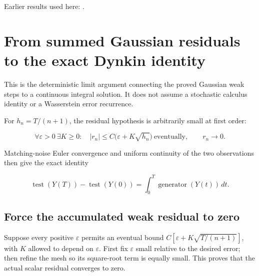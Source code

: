 \documentclass[11pt,a4paper]{report}
\begin{document}
Earlier results used here: \cite[Section~3.16.1]{LangevinLean2026ULASC}.
\section{\texorpdfstring{From summed Gaussian residuals to the exact Dynkin identity}{From summed Gaussian residuals to the exact Dynkin identity}}
\label{proof-module-AverageLMC-LaplacianDynkinLimit-lean}


This is the deterministic limit argument connecting the proved Gaussian weak steps to a continuous integral solution. It does not assume a stochastic calculus identity or a Wasserstein error recurrence.



For \(h_n=T/(n+1)\), the residual hypothesis is arbitrarily small at first order:


\[\forall\varepsilon>0\ \exists K\ge0:\quad
|r_n|\le C\bigl(\varepsilon+K\sqrt{h_n}\bigr)
\ \text{eventually},\qquad r_n\longrightarrow0.\]


Matching-noise Euler convergence and uniform continuity of the two observations then give the exact identity


\[\operatorname{test}(Y(T))-\operatorname{test}(Y(0))
=\int_0^T\operatorname{generator}(Y(t))\,dt.\]\subsection{\texorpdfstring{Force the accumulated weak residual to zero}{Force the accumulated weak residual to zero}}
\label{report-step-AverageLMC-LaplacianDynkinLimit-lean-1}


Suppose every positive \(\varepsilon\) permits an eventual bound \(C[\varepsilon +K\sqrt{T/(n+1)}]\), with \(K\) allowed to depend on \(\varepsilon\). First fix \(\varepsilon\) small relative to the desired error; then refine the mesh so its square-root term is equally small. This proves that the actual scalar residual converges to zero.
\end{document}
